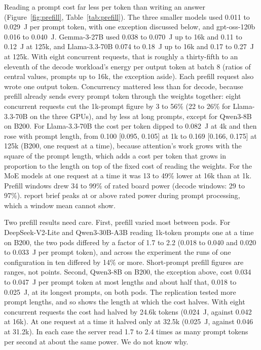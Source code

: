 \documentclass[11pt]{article}
\begin{document}
Reading a prompt cost far less per token than writing an answer (Figure~\ref{fig:prefill}, Table~\ref{tab:prefill}). The three smaller models used 0.011 to 0.029~J per prompt token, with one exception discussed below, and gpt-oss-120b 0.016 to 0.040~J. Gemma-3-27B used 0.038 to 0.070~J up to 16k and 0.11 to 0.12~J at 125k, and Llama-3.3-70B 0.074 to 0.18~J up to 16k and 0.17 to 0.27~J at 125k. With eight concurrent requests, that is roughly a thirty-fifth to an eleventh of the decode workload's energy per output token at batch 8 (ratios of central values, prompts up to 16k, the exception aside). Each prefill request also wrote one output token. Concurrency mattered less than for decode, because prefill already sends every prompt token through the weights together: eight concurrent requests cut the 1k-prompt figure by 3 to 56\% (22 to 26\% for Llama-3.3-70B on the three GPUs), and by less at long prompts, except for Qwen3-8B on B200. For Llama-3.3-70B the cost per token dipped to 0.082~J at 4k and then rose with prompt length, from 0.100 [0.095, 0.105] at 1k to 0.169 [0.166, 0.175] at 125k (B200, one request at a time), because attention's work grows with the square of the prompt length, which adds a cost per token that grows in proportion to the length on top of the fixed cost of reading the weights. For the MoE models at one request at a time it was 13 to 49\% lower at 16k than at 1k. Prefill windows drew 34 to 99\% of rated board power (decode windows: 29 to 97\%). \citet{patel2024power} report brief peaks at or above rated power during prompt processing, which a window mean cannot show.

Two prefill results need care. First, prefill varied most between pods. For DeepSeek-V2-Lite and Qwen3-30B-A3B reading 1k-token prompts one at a time on B200, the two pods differed by a factor of 1.7 to 2.2 (0.018 to 0.040 and 0.020 to 0.033~J per prompt token), and across the experiment the runs of one configuration in ten differed by 14\% or more. Short-prompt prefill figures are ranges, not points. Second, Qwen3-8B on B200, the exception above, cost 0.034 to 0.047~J per prompt token at most lengths and about half that, 0.018 to 0.025~J, at its longest prompts, on both pods. The replication tested more prompt lengths, and so shows the length at which the cost halves. With eight concurrent requests the cost had halved by 24.6k tokens (0.024~J, against 0.042 at 16k). At one request at a time it halved only at 32.5k (0.025~J, against 0.046 at 31.2k). In each case the server read 1.7 to 2.4 times as many prompt tokens per second at about the same power. We do not know why.
\end{document}
